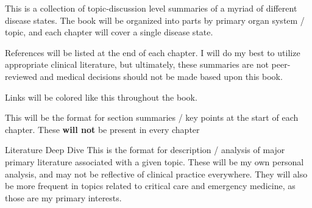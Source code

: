 \documentclass[main.tex]{subfiles}
\begin{document}
	
\large 
This is a collection of topic-discussion level summaries of a myriad of different disease states. The book will be organized into parts by primary organ system / topic, and each chapter will cover a single disease state. 

References will be listed at the end of each chapter. I will do my best to utilize appropriate clinical literature, but ultimately, these summaries are not peer-reviewed and medical decisions should not be made based upon this book.

{\color{linkColor}Links will be colored like this throughout the book.} 

\begin{summarybox}
	This will be the format for section summaries / key points at the start of each chapter. These \textbf{will not} be present in every chapter
\end{summarybox}

\begin{ddbox}{Literature Deep Dive}
	This is the format for description / analysis of major primary literature associated with a given topic. These will be my own personal analysis, and may not be reflective of clinical practice everywhere. They will also be more frequent in topics related to critical care and emergency medicine, as those are my primary interests.
\end{ddbox}
	
	
\end{document}
